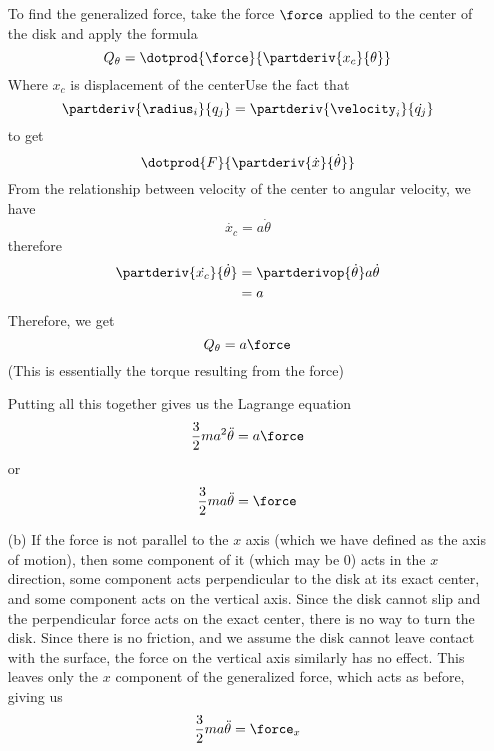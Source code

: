 \begin{itemize}
  To find the generalized force, take the force $\force$ applied to the
  center of the disk and apply the formula
  \[Q_{\theta} = \dotprod{\force}{\partderiv{x_c}{\theta}}\]
  Where $x_c$ is displacement of the centerUse the fact that
  \[\partderiv{\radius_i}{q_j} = \partderiv{\velocity_i}{\dot{q_j}}\]
  to get
  \[\dotprod{F}{\partderiv{\dot{x}}{\dot{\theta}}}\]
  From the relationship between velocity of the center to angular
  velocity, we have
  \[\dot{x_c} = a\dot{\theta}\]
  therefore
  \begin{align*}
    \partderiv{\dot{x_c}}{\dot{\theta}}
    &=
    \partderivop{\dot{\theta}}a\dot{\theta} \\
    &=
    a
  \end{align*}
  Therefore, we get
  \[ Q_{\theta} = a\force \]
  (This is essentially the torque resulting from the force)

  Putting all this together gives us the Lagrange equation
  \[ \frac{3}{2}ma^2\ddot{\theta} = a\force \]
  or
  \[ \frac{3}{2}ma\ddot{\theta} = \force \]

\item[(b)]
  If the force is not parallel to the $x$ axis (which we have defined as
  the axis of motion), then some component of it (which may be 0) acts
  in the $x$ direction, some component acts perpendicular to the disk at
  its exact center, and some component acts on the vertical axis.  Since
  the disk cannot slip and the perpendicular force acts on the exact
  center, there is no way to turn the disk.  Since there is no friction,
  and we assume the disk cannot leave contact with the surface, the
  force on the vertical axis similarly has no effect.  This leaves only
  the $x$ component of the generalized force, which acts as before,
  giving us
  \[ \frac{3}{2}ma\ddot{\theta} = \force_x \]

\end{itemize}
